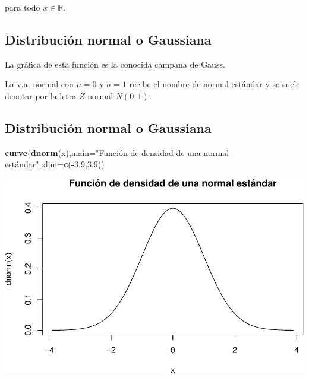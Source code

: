 \documentclass[]{book}
\newenvironment{Shaded}{\begin{snugshade}}{\end{snugshade}}
\newcommand{\DataTypeTok}[1]{\textcolor[rgb]{0.13,0.29,0.53}{#1}}
\newcommand{\FloatTok}[1]{\textcolor[rgb]{0.00,0.00,0.81}{#1}}
\newcommand{\KeywordTok}[1]{\textcolor[rgb]{0.13,0.29,0.53}{\textbf{#1}}}
\newcommand{\NormalTok}[1]{#1}
\newcommand{\OperatorTok}[1]{\textcolor[rgb]{0.81,0.36,0.00}{\textbf{#1}}}
\newcommand{\StringTok}[1]{\textcolor[rgb]{0.31,0.60,0.02}{#1}}
\begin{document}
para todo \(x\in \mathbb{R}.\)

\hypertarget{distribuciuxf3n-normal-o-gaussiana-2}{%
\subsection{Distribución normal o Gaussiana}\label{distribuciuxf3n-normal-o-gaussiana-2}}

La gráfica de esta función es la conocida campana de Gauss.

La v.a. normal con \(\mu=0\) y \(\sigma=1\) recibe el nombre de
normal estándar y se suele denotar por la letra \(Z\) normal \(N(0,1)\).

\hypertarget{distribuciuxf3n-normal-o-gaussiana-3}{%
\subsection{Distribución normal o Gaussiana}\label{distribuciuxf3n-normal-o-gaussiana-3}}

\begin{Shaded}
\begin{Highlighting}[]
\KeywordTok{curve}\NormalTok{(}\KeywordTok{dnorm}\NormalTok{(x),}\DataTypeTok{main=}\StringTok{"Función de densidad de una normal estándar"}\NormalTok{,}\DataTypeTok{xlim=}\KeywordTok{c}\NormalTok{(}\OperatorTok{-}\FloatTok{3.9}\NormalTok{,}\FloatTok{3.9}\NormalTok{))}
\end{Highlighting}
\end{Shaded}

\begin{center}\includegraphics{curso-probabilidad-udemy_files/figure-latex/normaldensidad1-1} \end{center}
\end{document}
